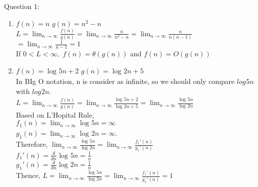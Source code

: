 \documentclass[12pt]{article}
\begin{document}
\pagebreak
\large Question 1:\\
\normalsize 
\begin{enumerate}[label=(\alph*)]
  \item $f(n) = n$ \hspace{1cm} $g(n) = n^2 - n$ \vspace{1mm} \\
    $L = \lim_{n\to\infty} \frac{f(n)}{g(n)} = \lim_{n\to\infty} \frac{n}{n^2 - n} = \lim_{n\to\infty} \frac{n}{n(n-1)}$ \vspace{1mm} \\
    $= \lim_{n\to\infty} \frac{1}{n - 1} = 1$ \vspace{1mm} \\
    If $0 < L < \infty,$ $f(n) = \theta(g(n))$ and $f(n) = O(g(n)) $
  \item $f(n) = \log_{}{5n} + 2$ \hspace{1cm} $g(n) = \log_{}{2n} + 5$ \vspace{1mm} \\
    In BIg O notation, n is consider as infinite, so we should only compare $log_{}{5n}$ with $log_{}{2n}$. \vspace{1mm} \\
    $L = \lim_{n\to\infty} \frac{f(n)}{g(n)} = \lim_{n\to\infty} \frac{\log_{}{5n} + 2}{\log_{}{2n} + 5} 
    = \lim_{n\to\infty} \frac{\log_{}{5n}}{\log_{}{2n}}$ \vspace{2mm} \\
    Based on L'Hopital Rule, \vspace{1mm} \\
    $f_1(n) = \lim_{n\to\infty} \log_{}{5n} = \infty $ \vspace{1mm} \\
    $g_1(n) = \lim_{n\to\infty} \log_{}{2n} = \infty $. \vspace{1mm} \\
    Therefore, $\lim_{n\to\infty} \frac{\log_{}{5n}}{\log_{}{2n}} = \lim_{n\to\infty} \frac{f_1'(n)}{g_1'(n)}$ \vspace{1mm} \\
    $f_1'(n) = \frac{d}{dn}\log_{}{5n} = \frac{1}{n}$ \vspace{1mm} \\
    $g_1'(n) = \frac{d}{dn}\log_{}{2n} = \frac{1}{n}$ \vspace{1mm} \\
    Thence, $L = \lim_{n\to\infty} \frac{\log_{}{5n}}{\log_{}{2n}} = \lim_{n\to\infty} \frac{f_1'(n)}{g_1'(n)} = 1$ \vspace{1mm} \\

\end{enumerate}
\end{document}
